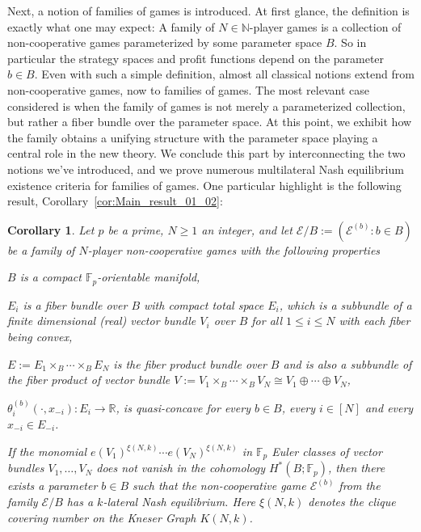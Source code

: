 \documentclass[a4paper,11pt,reqno,english]{amsart}
\theoremstyle{plain}
\newtheorem*{corollary*}{Corollary}
\theoremstyle{definition}
\newcommand{\Ecal}{\mathcal{E}}
\begin{document}
\medskip
Next, a notion of families of games is introduced.
At first glance, the definition is exactly what one may expect: A family of $N\in\mathbb{N}$-player games is a collection of non-cooperative games parameterized by some parameter space $B$. So in particular the strategy spaces and profit functions depend on the parameter $b\in B$.
Even with such a simple definition, almost all classical notions extend from non-cooperative games, now to families of games.
The most relevant case considered is when the family of games is not merely a parameterized collection, but rather a fiber bundle over the parameter space.
At this point, we exhibit how the family obtains a unifying structure with the parameter space playing a central role in the new theory.
We conclude this part by interconnecting the two notions we've introduced, and we prove numerous multilateral Nash equilibrium existence criteria for families of games. One particular highlight is the following result, Corollary~\ref{cor:Main_result_01_02}:

\begin{corollary*}
	Let $p$ be a prime, $N\geq 1$ an integer, and let $\Ecal/B:=(\Ecal^{(b)}:b\in B)$ be a family of $N$-player non-cooperative games with the following properties
	\begin{compactitem}[\quad --]
		\item $B$ is a compact $\mathbb{F}_p$-orientable manifold,
		\item $E_i$ is a fiber bundle over $B$ with compact total space $E_i$, which is a subbundle of a finite dimensional (real) vector bundle $V_i$ over $B$ for all $1\leq i\leq N$ with each fiber being convex,
		\item $E:=E_1\times_B\cdots \times_BE_N$ is the fiber product bundle over $B$ and is also a subbundle of the fiber product of vector bundle $V:= V_1\times_B\cdots\times_B V_N\cong V_1\oplus\cdots\oplus V_N$,
		\item $\theta_i^{(b)}(\cdot, x_{-i})\colon E_i\longrightarrow\mathbb{R}$, is quasi-concave for every $b\in B$, every $i\in [N]$ and every $x_{-i}\in E_{-i}$.
	\end{compactitem}

	\smallskip\noindent
	If the monomial $e(V_1)^{\xi(N,k)}\cdots e(V_N)^{\xi(N,k)}$ in $\mathbb{F}_p$ Euler classes of vector bundles $V_1,\dots, V_N$ does not vanish in the cohomology $H^*(B;\mathbb{F}_p)$, then there exists a parameter $b\in B$ such that the non-cooperative game $\Ecal^{(b)}$ from the family $\Ecal/B$ has a $k$-lateral Nash equilibrium.
	Here $\xi(N,k)$ denotes the clique covering number on the Kneser Graph $K(N,k)$.
\end{corollary*}
\end{document}
